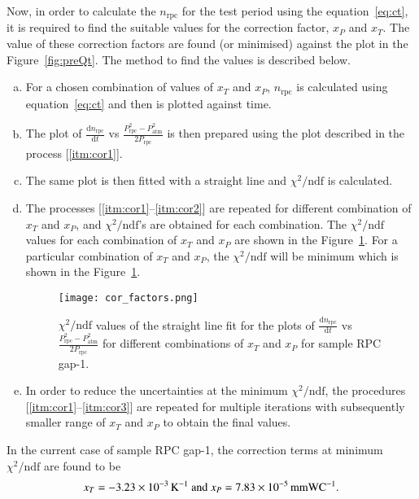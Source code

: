 Now, in order to calculate the $n_{\textrm{rpc}}$ for the test period using the
equation~\ref{eq:ct}, it is required to find the suitable values for the
correction factor, $x_P$ and $x_T$. The value of these correction factors are
found (or minimised) against the plot in the Figure~\ref{fig:preQt}. The method
to find the values is described below.
\begin{enumerate}[a.]
\item \label{itm:cor1} For a chosen combination of values of $x_T$ and $x_P$,
  $n_{\textrm{rpc}}$ is calculated using equation~\ref{eq:ct} and then is plotted
  against time.
\item The plot of $\frac{\mathrm{d}n_{\textrm{rpc}}}{\mathrm{d}t}$ vs
  $\frac{P_{\textrm{rpc}}^{2}-P_{\textrm{atm}}^{2}}{2P_{\textrm{rpc}}}$ is then prepared
  using the plot described in the process [\ref{itm:cor1}].
\item \label{itm:cor2} The same plot 
  is then fitted with a straight line and $\chi^2/\textrm{ndf}$ is calculated.
\item \label{itm:cor3} The processes [\ref{itm:cor1}--\ref{itm:cor2}] are
  repeated for different combination of $x_T$ and $x_P$, and
  $\chi^2/\textrm{ndf}$'s are obtained for each combination. The
  $\chi^2/\textrm{ndf}$ values for each combination of $x_T$ and $x_P$ are
  shown in the Figure~\ref{fig:xp}. For a particular combination of $x_T$ and
  $x_P$, the $\chi^2/\textrm{ndf}$ will be minimum which is shown in the
  Figure~\ref{fig:xp}.
  \begin{figure}[h]
    \centering
    \texttt{[image: cor\_factors.png]}
    \caption{$\chi^2/\textrm{ndf}$ values of the straight line fit for the
      plots of $\frac{\mathrm{d}n_{\textrm{rpc}}}{\mathrm{d}t}$ vs
      $\frac{P_{\textrm{rpc}}^{2}-P_{\textrm{atm}}^{2}}{2P_{\textrm{rpc}}}$ for different
      combinations of $x_T$ and $x_P$ for sample RPC gap-1.}
    \label{fig:xp}
  \end{figure}
\item In order to reduce the uncertainties at the minimum
  $\chi^2/\textrm{ndf}$, the procedures [\ref{itm:cor1}--\ref{itm:cor3}] are
  repeated for multiple iterations with subsequently smaller range of $x_T$
  and $x_P$ to obtain the final values.
\end{enumerate}

In the current case of sample RPC gap-1, the correction terms at minimum
$\chi^2/\textrm{ndf}$ are found to be
\[x_T=-3.23\times10^{-3}\textrm{\,K}^{-1}\textrm{ and }x_P=7.83\times10^{-5}\textrm{\,mmWC}^{-1}\textrm{.}\]

